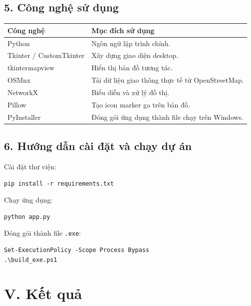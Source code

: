\documentclass[12pt,a4paper]{article}
\begin{document}
\subsection*{5. Công nghệ sử dụng}

\begin{longtable}{|p{4cm}|p{10cm}|}
\hline
\textbf{Công nghệ} & \textbf{Mục đích sử dụng}\\
\hline
Python & Ngôn ngữ lập trình chính.\\
\hline
Tkinter / CustomTkinter & Xây dựng giao diện desktop.\\
\hline
tkintermapview & Hiển thị bản đồ tương tác.\\
\hline
OSMnx & Tải dữ liệu giao thông thực tế từ OpenStreetMap.\\
\hline
NetworkX & Biểu diễn và xử lý đồ thị.\\
\hline
Pillow & Tạo icon marker ga trên bản đồ.\\
\hline
PyInstaller & Đóng gói ứng dụng thành file chạy trên Windows.\\
\hline
\end{longtable}

\subsection*{6. Hướng dẫn cài đặt và chạy dự án}

Cài đặt thư viện:
\begin{lstlisting}[style=pythonstyle, caption={Cài đặt thư viện cần thiết}]
pip install -r requirements.txt
\end{lstlisting}

Chạy ứng dụng:
\begin{lstlisting}[style=pythonstyle, caption={Chạy ứng dụng}]
python app.py
\end{lstlisting}

Đóng gói thành file \texttt{.exe}:
\begin{lstlisting}[style=pythonstyle, caption={Đóng gói bằng PyInstaller}]
Set-ExecutionPolicy -Scope Process Bypass
.\build_exe.ps1
\end{lstlisting}

\section*{V. Kết quả}
\end{document}
